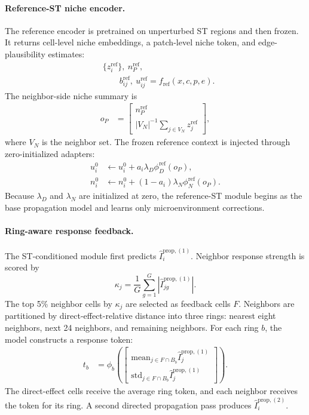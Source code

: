 \documentclass[sigconf,anonymous,review]{acmart}
\begin{document}
\paragraph{Reference-ST niche encoder.}
The reference encoder is pretrained on unperturbed ST regions and then frozen. It returns cell-level niche embeddings, a patch-level niche token, and edge-plausibility estimates:
\[
\begin{aligned}
&\{z_i^{\mathrm{ref}}\},\ n_P^{\mathrm{ref}},\\
&\qquad b_{ij}^{\mathrm{ref}},\ u_{ij}^{\mathrm{ref}}
 = f_{\mathrm{ref}}(x,c,p,e).
\end{aligned}
\]
The neighbor-side niche summary is
\[
\begin{aligned}
o_P
&=
\begin{bmatrix}
n_P^{\mathrm{ref}}\\
|V_N|^{-1}\sum_{j\in V_N}z_j^{\mathrm{ref}}
\end{bmatrix},
\end{aligned}
\]
where $V_N$ is the neighbor set. The frozen reference context is injected through zero-initialized adapters:
\[
\begin{aligned}
u_i^0
&\leftarrow
u_i^0+a_i\lambda_D\phi_D^{\mathrm{ref}}(o_P),\\
n_i^0
&\leftarrow
n_i^0+(1-a_i)\lambda_N\phi_N^{\mathrm{ref}}(o_P).
\end{aligned}
\]
Because $\lambda_D$ and $\lambda_N$ are initialized at zero, the reference-ST module begins as the base propagation model and learns only microenvironment corrections.

\paragraph{Ring-aware response feedback.}
The ST-conditioned module first predicts $\widehat I_i^{\mathrm{prop},(1)}$. Neighbor response strength is scored by
\[
\kappa_j
=
\frac{1}{G}
\sum_{g=1}^{G}
\left|
\widehat I_{jg}^{\mathrm{prop},(1)}
\right|.
\]
The top 5\% neighbor cells by $\kappa_j$ are selected as feedback cells $F$. Neighbors are partitioned by direct-effect-relative distance into three rings: nearest eight neighbors, next 24 neighbors, and remaining neighbors. For each ring $b$, the model constructs a response token:
\[
\begin{aligned}
t_b
&=
\phi_b\!\left(
\begin{bmatrix}
\mathrm{mean}_{j\in F\cap B_b}\widehat I_j^{\mathrm{prop},(1)}\\
\mathrm{std}_{j\in F\cap B_b}\widehat I_j^{\mathrm{prop},(1)}
\end{bmatrix}
\right).
\end{aligned}
\]
The direct-effect cells receive the average ring token, and each neighbor receives the token for its ring. A second directed propagation pass produces $\widehat I_i^{\mathrm{prop},(2)}$.
\end{document}
